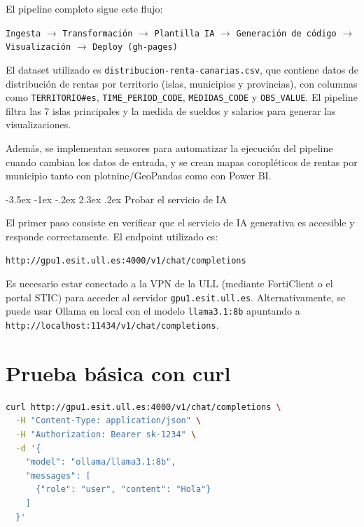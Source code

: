 \documentclass[11pt]{report}
\makeatletter
\renewcommand\chapter{\@startsection{chapter}{0}{\z@}%
    {-3.5ex \@plus -1ex \@minus -.2ex}%
    {2.3ex \@plus.2ex}%
    {\normalfont\Large\bfseries}}
\makeatother
\begin{document}
El pipeline completo sigue este flujo:

\begin{center}
\texttt{Ingesta} $\rightarrow$ \texttt{Transformación} $\rightarrow$ \texttt{Plantilla IA} $\rightarrow$
\texttt{Generación de código} $\rightarrow$ \texttt{Visualización} $\rightarrow$ \texttt{Deploy (gh-pages)}
\end{center}

El dataset utilizado es \texttt{distribucion-renta-canarias.csv}, que contiene datos de distribución
de rentas por territorio (islas, municipios y provincias), con columnas como \texttt{TERRITORIO\#es},
\texttt{TIME\_PERIOD\_CODE}, \texttt{MEDIDAS\_CODE} y \texttt{OBS\_VALUE}. El pipeline filtra las
7 islas principales y la medida de sueldos y salarios para generar las visualizaciones.

Además, se implementan sensores para automatizar la ejecución del pipeline cuando cambian los datos
de entrada, y se crean mapas coropléticos de rentas por municipio tanto con plotnine/GeoPandas
como con Power BI.

\chapter{Probar el servicio de IA}

El primer paso consiste en verificar que el servicio de IA generativa es accesible y responde
correctamente. El endpoint utilizado es:

\begin{verbatim}
http://gpu1.esit.ull.es:4000/v1/chat/completions
\end{verbatim}

Es necesario estar conectado a la VPN de la ULL (mediante FortiClient o el portal STIC) para
acceder al servidor \texttt{gpu1.esit.ull.es}. Alternativamente, se puede usar Ollama en local
con el modelo \texttt{llama3.1:8b} apuntando a \texttt{http://localhost:11434/v1/chat/completions}.

\section{Prueba básica con curl}

\begin{lstlisting}[style=mystyle, language=bash, caption={Petición básica al servicio de IA}]
curl http://gpu1.esit.ull.es:4000/v1/chat/completions \
  -H "Content-Type: application/json" \
  -H "Authorization: Bearer sk-1234" \
  -d '{
    "model": "ollama/llama3.1:8b",
    "messages": [
      {"role": "user", "content": "Hola"}
    ]
  }'
\end{lstlisting}
\end{document}
